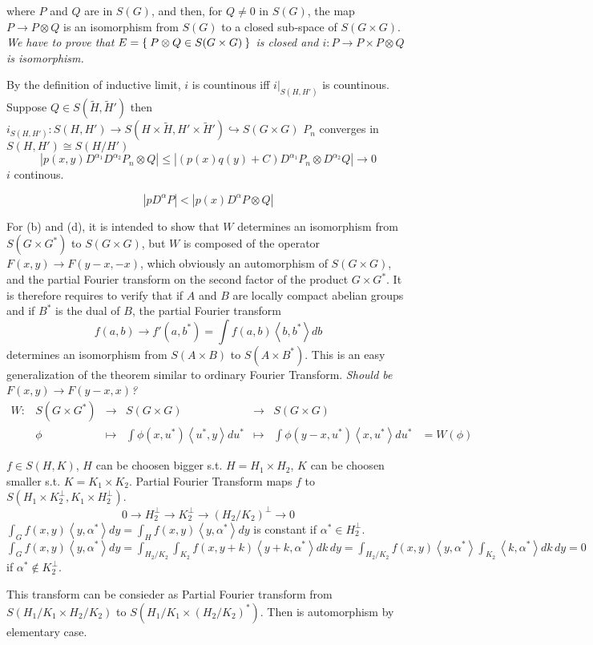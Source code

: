 \documentclass[12pt]{amsart}
\newenvironment{expl}{\it}{\color{black}\normalsize}
\def\inn#1#2{\left\langle{#1},{#2}\right\rangle}
\def\abs#1{\left|{#1}\right|}
\begin{document}
where $P$ and $Q$ are in $S(G)$, 
and then, for $Q\neq 0$ in $S(G)$, the map $P\to  P\otimes Q$ 
is an isomorphism from 
$S(G)$ to a closed sub-space of $S(G\times G)$.
\begin{expl}
\def\tH{{\tilde{H}}}
We have to prove that $E=\Set{P\otimes Q\in S(G\times G)}$ is closed
and $i:P\to P\times P\otimes Q$ is isomorphism.

By the definition of inductive limit, $i$ is countinous iff
$i|_{S(H,H')}$ is countinous.
Suppose $Q\in S(\tH,\tH')$ then 
$i_{S(H,H')}:S(H,H') \to S(H\times \tH, H'\times \tH')\hookrightarrow S(G\times G)$
$P_n$ converges in $S(H,H')\cong S(H/H')$
\[
\abs{p(x,y)D^{\alpha_1}D^{\alpha_2}P_n\otimes Q}\leq \abs{(p(x)q(y)+C)D^{\alpha_1}P_n\otimes D^{\alpha_2}Q}
\to 0
\]
$i$ continous.

\[
\abs{p D^{\alpha} P} < \abs{p(x)D^{\alpha} P\otimes Q} 
\]
\end{expl}

For (b) and (d), it is intended to show that $W$
determines an isomorphism from $S(G\times G^*)$ to $S(G\times G)$, 
but $W$ is composed of the operator
$F(x, y) \to F(y-x,-x)$, which obviously an automorphism of $S(G\times G)$,
and the partial Fourier transform on the second factor of 
the product $G\times G^*$.
It is therefore requires to verify that if $A$ and $B$ are
locally compact abelian groups 
and if $B^*$ is the dual of $B$, the partial Fourier transform
\[
f(a,b)\to f'(a,b^*) = \int f(a,b)\inn{b}{b^*} db
\]
determines an isomorphism from $S(A\times B)$ to  $S(A\times B^*)$.
This is an easy generalization of the theorem similar to
ordinary Fourier Transform.
\begin{expl}
Should be $F(x,y)\to F(y-x,x)$?
\[
\begin{matrix}
W \colon & S(G\times G^*) & \to & S(G\times G) & \to & S(G\times G)&\\
&\phi &\mapsto & \int \phi(x,u^*)\inn{u^*}{y}du^* 
& \mapsto & \int \phi(y-x, u^*)\inn{x}{u^*}du^* &= W(\phi)
\end{matrix}
\]

$f\in S(H,K)$, $H$ can be choosen bigger s.t. $H=H_1\times H_2$,
$K$ can be choosen smaller s.t. $K = K_1\times K_2$.
Partial Fourier Transform maps $f$ to 
$S(H_1\times K_2^\perp, K_1\times H_2^\perp)$.
\[
0\to H_2^\perp \to K_2^\perp \to (H_2/K_2)^\perp\to 0
\]
$\int_G f(x,y)\inn{y}{\alpha^*}dy 
= \int_H f(x,y)\inn{y}{\alpha^*}dy$
is constant if $\alpha^* \in H_2^\perp$.
$\int_G f(x,y)\inn{y}{\alpha^*}dy 
= \int_{H_2/K_2} \int_{K_2} f(x,y+k)\inn{y+k}{\alpha^*} dk\,dy
= \int_{H_2/K_2}  f(x,y)\inn{y}{\alpha^*}
\int_{K_2} \inn{k}{\alpha^*} dk\,dy
=0$
if $\alpha^*\notin K_2^\perp$.

This transform can be consieder as Partial Fourier transform 
from $S(H_1/K_1 \times H_2/K_2)$ 
to $S(H_1/K_1 \times (H_2/K_2)^*)$.
Then is automorphism by elementary case. 
\end{expl}
\end{document}
